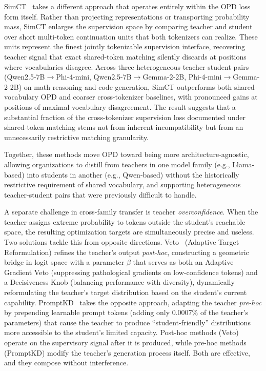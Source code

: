 \documentclass{article} %
\begin{document}
SimCT~\citep{2605.07711} takes a different approach that operates entirely within the OPD loss form itself. Rather than projecting representations or transporting probability mass, SimCT enlarges the supervision space by comparing teacher and student over short multi-token continuation units that both tokenizers can realize. These units represent the finest jointly tokenizable supervision interface, recovering teacher signal that exact shared-token matching silently discards at positions where vocabularies disagree. Across three heterogeneous teacher-student pairs (Qwen2.5-7B$\to$Phi-4-mini, Qwen2.5-7B$\to$Gemma-2-2B, Phi-4-mini$\to$Gemma-2-2B) on math reasoning and code generation, SimCT outperforms both shared-vocabulary OPD and coarser cross-tokenizer baselines, with pronounced gains at positions of maximal vocabulary disagreement. The result suggests that a substantial fraction of the cross-tokenizer supervision loss documented under shared-token matching stems not from inherent incompatibility but from an unnecessarily restrictive matching granularity.

Together, these methods move OPD toward being more architecture-agnostic, allowing organizations to distill from teachers in one model family (e.g., Llama-based) into students in another (e.g., Qwen-based) without the historically restrictive requirement of shared vocabulary, and supporting heterogeneous teacher-student pairs that were previously difficult to handle.

A separate challenge in cross-family transfer is teacher \emph{overconfidence}. When the teacher assigns extreme probability to tokens outside the student's reachable space, the resulting optimization targets are simultaneously precise and useless. Two solutions tackle this from opposite directions. Veto~\citep{2601.07155} (Adaptive Target Reformulation) refines the teacher's output \emph{post-hoc}, constructing a geometric bridge in logit space with a parameter $\beta$ that serves as both an Adaptive Gradient Veto (suppressing pathological gradients on low-confidence tokens) and a Decisiveness Knob (balancing performance with diversity), dynamically reformulating the teacher's target distribution based on the student's current capability. PromptKD~\citep{2402.12842} takes the opposite approach, adapting the teacher \emph{pre-hoc} by prepending learnable prompt tokens (adding only 0.0007\% of the teacher's parameters) that cause the teacher to produce ``student-friendly'' distributions more accessible to the student's limited capacity. Post-hoc methods (Veto) operate on the supervisory signal after it is produced, while pre-hoc methods (PromptKD) modify the teacher's generation process itself. Both are effective, and they compose without interference.
\end{document}
